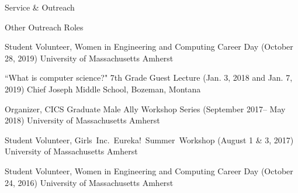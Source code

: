 \documentclass{resume} %
\begin{document}
\begin{rSection}{Service \& Outreach}
\begin{rSubsection}{Other Outreach Roles}{}{}{}
\item {Student Volunteer, Women in Engineering and Computing Career Day} ({October 28, 2019})
{University of Massachusetts Amherst}{}


\item {``What is computer science?" 7th Grade Guest Lecture} ({Jan. 3, 2018 and Jan. 7, 2019}) 
{Chief Joseph Middle School, Bozeman, Montana}

\item {Organizer, CICS Graduate Male Ally Workshop Series} ({September 2017-- May 2018}) {University of Massachusetts Amherst}

\item {Student Volunteer, Girls~Inc.~Eureka!~Summer~Workshop} ({August 1 \& 3, 2017}) {University of Massachusetts Amherst}

\item {Student Volunteer, Women in Engineering and Computing Career Day} ({October 24, 2016})
{University of Massachusetts Amherst}{}
\end{rSubsection}

\end{rSection}





\end{document}
